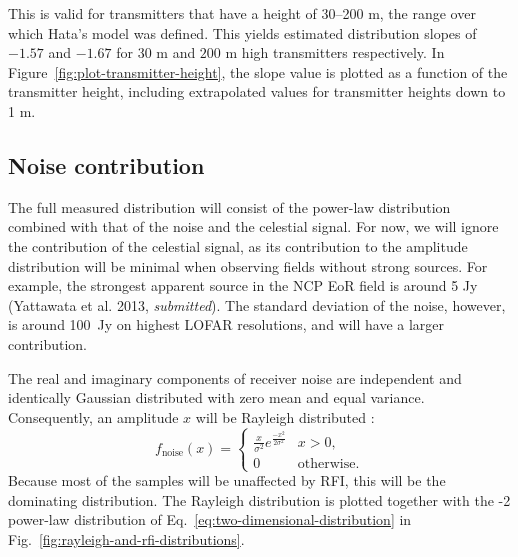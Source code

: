 \documentclass[useAMS,usenatbib]{mn2e}
\begin{document}
This is valid for transmitters that have a height of 30--200 m, the range over which Hata's model was defined. This yields estimated distribution slopes of $-1.57$ and $-1.67$ for $30$ m and $200$ m high transmitters respectively. In Figure~\ref{fig:plot-transmitter-height}, the slope value is plotted as a function of the transmitter height, including extrapolated values for transmitter heights down to 1 m.

\subsection{Noise contribution} \label{sec:histogram-noise}
The full measured distribution will consist of the power-law distribution combined with that of the noise and the celestial signal. For now, we will ignore the contribution of the celestial signal, as its contribution to the amplitude distribution will be minimal when observing fields without strong sources. For example, the strongest apparent source in the NCP EoR field is around 5 Jy (Yattawata et al. 2013, \textit{submitted}). %
The standard deviation of the noise, however, is around 100~Jy on highest LOFAR resolutions, and will have a larger contribution.

The real and imaginary components of receiver noise are independent and identically Gaussian distributed with zero mean and equal variance. Consequently, an amplitude $x$ will be Rayleigh distributed \citep[\S6-2]{papoulis-stochastic-processes}: 
\begin{equation}\label{eq:rayleigh-formula}
f_\textrm{noise}(x) =
\begin{cases}
\frac{x}{\sigma^2} e^{\frac{-x^2}{2\sigma^2}} & x > 0, \\
0 & \textrm{otherwise.}
\end{cases}
\end{equation}
Because most of the samples will be unaffected by RFI, this will be the dominating distribution. The Rayleigh distribution is plotted together with the -2 power-law distribution of Eq.~\eqref{eq:two-dimensional-distribution} in Fig.~\ref{fig:rayleigh-and-rfi-distributions}.
\end{document}
